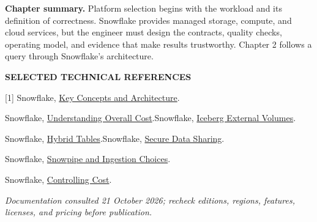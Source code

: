 \documentclass[11pt,twoside]{article}
\begin{document}
\textbf{Chapter summary.} Platform selection begins with the workload and its definition of correctness. Snowflake provides managed storage, compute, and cloud services, but the engineer must design the contracts, quality checks, operating model, and evidence that make results trustworthy. Chapter 2 follows a query through Snowflake's architecture.

{\small\sffamily\bfseries\color{steelblue}SELECTED TECHNICAL REFERENCES}\par
{\fontsize{8.3}{10}\selectfont{}
[1] Snowflake, \href{https://docs.snowflake.com/en/user-guide/intro-key-concepts}{Key Concepts and Architecture}.\par
[2] Snowflake, \href{https://docs.snowflake.com/en/user-guide/cost-understanding-overall}{Understanding Overall Cost}.\quad
[3] Snowflake, \href{https://docs.snowflake.com/en/user-guide/tables-iceberg-managing-external-volumes}{Iceberg External Volumes}.\par
[4] Snowflake, \href{https://docs.snowflake.com/en/user-guide/tables-hybrid}{Hybrid Tables}.\quad
[5] Snowflake, \href{https://docs.snowflake.com/en/user-guide/data-sharing-intro}{Secure Data Sharing}.\par
[6] Snowflake, \href{https://docs.snowflake.com/en/user-guide/data-load-snowpipe-intro}{Snowpipe and Ingestion Choices}.\par
[7] Snowflake, \href{https://docs.snowflake.com/en/user-guide/cost-controlling}{Controlling Cost}.\par
\textit{Documentation consulted 21 October 2026; recheck editions, regions, features, licenses, and pricing before publication.}\par}
\end{document}
